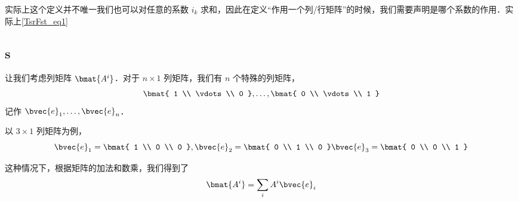 实际上这个定义并不唯一我们也可以对任意的系数 $i_k$ 求和，因此在定义“作用一个列/行矩阵”的时候，我们需要声明是哪个系数的作用．实际上\autoref{TsrFst_eq1} 

\subsection{s}
让我们考虑列矩阵 $\bmat{A^i}$．对于 $n \times 1$ 列矩阵，我们有 $n$ 个特殊的列矩阵，
$$
\bmat{
1 \\
\vdots \\
0
}, \dots,
\bmat{
0 \\
\vdots \\
1
}
$$
记作 $\bvec{e}_1, \dots, \bvec{e}_n$．

以 $3 \times 1$ 列矩阵为例，
$$
\bvec{e}_1 = \bmat{
1 \\
0 \\
0
},
\bvec{e}_2 = \bmat{
0 \\
1 \\
0
}
\bvec{e}_3 = \bmat{
0 \\
0 \\
1
}
$$

这种情况下，根据矩阵的加法和数乘，我们得到了
$$
\bmat{A^i} = \sum_i A^i \bvec{e}_i
$$


